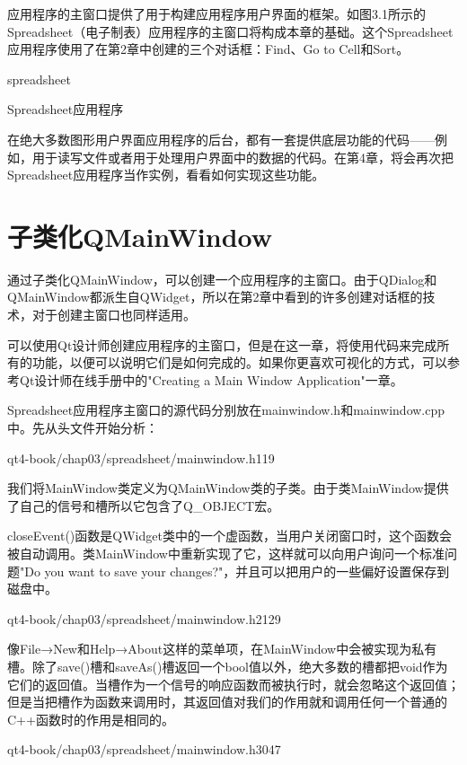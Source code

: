 \documentclass[11pt,oneside]{book}
\begin{document}
\begin{common-format}
应用程序的主窗口提供了用于构建应用程序用户界面的框架。如图3.1所示的Spreadsheet（电子制表）应用程序的主窗口将构成本章的基础。这个Spreadsheet应用程序使用了在第2章中创建的三个对话框：Find、Go to Cell和Sort。
\begin{linefig}[0.9]{spreadsheet}
\caption{Spreadsheet应用程序}
\label{fig:spreadsheet}
\end{linefig}

在绝大多数图形用户界面应用程序的后台，都有一套提供底层功能的代码——例如，用于读写文件或者用于处理用户界面中的数据的代码。在第4章，将会再次把Spreadsheet应用程序当作实例，看看如何实现这些功能。

\section{子类化QMainWindow}
通过子类化QMainWindow，可以创建一个应用程序的主窗口。由于QDialog和QMainWindow都派生自QWidget，所以在第2章中看到的许多创建对话框的技术，对于创建主窗口也同样适用。

可以使用Qt设计师创建应用程序的主窗口，但是在这一章，将使用代码来完成所有的功能，以便可以说明它们是如何完成的。如果你更喜欢可视化的方式，可以参考Qt设计师在线手册中的"Creating a Main Window Application"一章。

Spreadsheet应用程序主窗口的源代码分别放在mainwindow.h和mainwindow.cpp中。先从头文件开始分析：
\begin{cppline}{qt4-book/chap03/spreadsheet/mainwindow.h}{1}{19}
\end{cppline}

我们将MainWindow类定义为QMainWindow类的子类。由于类MainWindow提供了自己的信号和槽所以它包含了Q\_{}OBJECT宏。

closeEvent()函数是QWidget类中的一个虚函数，当用户关闭窗口时，这个函数会被自动调用。类MainWindow中重新实现了它，这样就可以向用户询问一个标准问题"Do you want to save your changes?"，并且可以把用户的一些偏好设置保存到磁盘中。

\begin{cppline}{qt4-book/chap03/spreadsheet/mainwindow.h}{21}{29}
\end{cppline}

像File→New和Help→About这样的菜单项，在MainWindow中会被实现为私有槽。除了save()槽和saveAs()槽返回一个bool值以外，绝大多数的槽都把void作为它们的返回值。当槽作为一个信号的响应函数而被执行时，就会忽略这个返回值；但是当把槽作为函数来调用时，其返回值对我们的作用就和调用任何一个普通的C++函数时的作用是相同的。

\begin{cppline}{qt4-book/chap03/spreadsheet/mainwindow.h}{30}{47}
\end{cppline}


\end{common-format}
\end{document}
